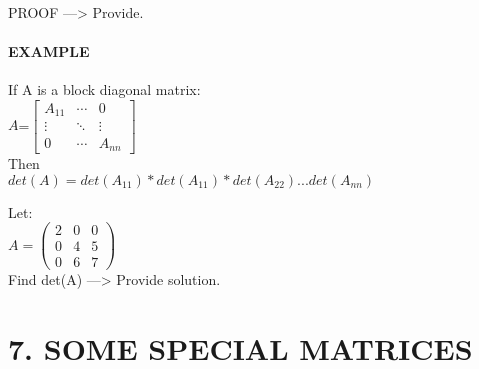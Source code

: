 \documentclass[]{article}
\let\oldparagraph\paragraph
\renewcommand{\paragraph}[1]{\oldparagraph{#1}\mbox{}}
\begin{document}
PROOF ---\textgreater{} Provide.

\paragraph{EXAMPLE~}\label{example-5}

If A is a block diagonal matrix:\\

\(A\)=\(\begin{bmatrix} A_{11} & \cdots & 0 \\ \vdots & \ddots & \vdots \\ 0 & \cdots & A_{nn} \end{bmatrix}\)\\[2\baselineskip]Then\\
 \(det(A)=det(A_{11})*det(A_{11})*det(A_{22})...det(A_{nn})\)

Let:\\

\(A =\begin{pmatrix} 2 & 0 & 0\\ 0 & 4 & 5 \\ 0 & 6 & 7 \end{pmatrix}\)\\

Find det(A) ---\textgreater{} Provide solution.

\section{\texorpdfstring{7. SOME SPECIAL MATRICES\\
}{7. SOME SPECIAL MATRICES }}\label{some-special-matrices}
\end{document}
